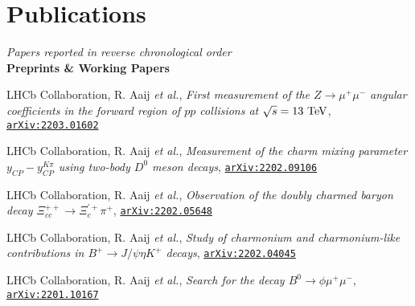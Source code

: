\newcommand{\journal}[1]
  {\textbf{\large #1}\\\vspace{-5mm}}

\newcommand{\arxiv}[1]
  {\href{https://arxiv.org/abs/#1}{\texttt{arXiv:#1}}}


\section*{Publications}
\begin{cvcontent}
  \emph{Papers reported in reverse chronological order}\\[2.5mm]
  \journal{Preprints \& Working Papers}
  \begin{enumerate}[label={[\arabic*]}, leftmargin=1.5cm]
    \item LHCb Collaboration, R. Aaij \emph{et al.},
    \emph{First measurement of the $Z\rightarrow \mu^+ \mu^-$ angular coefficients in the forward region of $pp$ collisions at $\sqrt{s}=13~\rm{TeV}$},
    \arxiv{2203.01602}
    \item LHCb Collaboration, R. Aaij \emph{et al.},
    \emph{Measurement of the charm mixing parameter $y_{CP} - y_{CP}^{K\pi}$ using two-body $D^0$ meson decays},
    \arxiv{2202.09106}
    \item LHCb Collaboration, R. Aaij \emph{et al.},
    \emph{Observation of the doubly charmed baryon decay $\Xi_{cc}^{++}\to \Xi_{c}^{'+}\pi^{+}$},
    \arxiv{2202.05648}
    \item LHCb Collaboration, R. Aaij \emph{et al.},
    \emph{Study of charmonium and charmonium-like contributions in $B^+ \rightarrow J/\psi \eta K^+$ decays},
    \arxiv{2202.04045}
    \item LHCb Collaboration, R. Aaij \emph{et al.},
    \emph{Search for the decay $B^0\to\phi\mu^+\mu^-$},
    \arxiv{2201.10167}

\end{enumerate}
\end{cvcontent}
